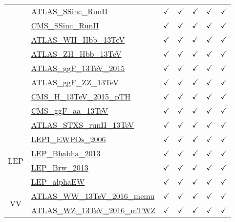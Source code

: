 \documentclass{article}
\begin{document}
\begin{longtable}{|c|l|c|c|c|c|c|}
 & \href{https://arxiv.org}{ATLAS_SSinc_RunII}  & $\checkmark$ & $\checkmark$ & $\checkmark$ & $\checkmark$ & $\checkmark$\\ \cline{2-7}
 & \href{https://arxiv.org}{CMS_SSinc_RunII}  & $\checkmark$ & $\checkmark$ & $\checkmark$ & $\checkmark$ & $\checkmark$\\ \cline{2-7}
 & \href{https://arxiv.org}{ATLAS_WH_Hbb_13TeV}  & $\checkmark$ & $\checkmark$ & $\checkmark$ & $\checkmark$ & $\checkmark$\\ \cline{2-7}
 & \href{https://arxiv.org}{ATLAS_ZH_Hbb_13TeV}  & $\checkmark$ & $\checkmark$ & $\checkmark$ & $\checkmark$ & $\checkmark$\\ \cline{2-7}
 & \href{https://arxiv.org}{ATLAS_ggF_13TeV_2015}  & $\checkmark$ & $\checkmark$ & $\checkmark$ & $\checkmark$ & $\checkmark$\\ \cline{2-7}
 & \href{https://arxiv.org}{ATLAS_ggF_ZZ_13TeV}  & $\checkmark$ & $\checkmark$ & $\checkmark$ & $\checkmark$ & $\checkmark$\\ \cline{2-7}
 & \href{https://arxiv.org}{CMS_H_13TeV_2015_pTH}  & $\checkmark$ & $\checkmark$ & $\checkmark$ & $\checkmark$ & $\checkmark$\\ \cline{2-7}
 & \href{https://arxiv.org}{CMS_ggF_aa_13TeV}  & $\checkmark$ & $\checkmark$ & $\checkmark$ & $\checkmark$ & $\checkmark$\\ \cline{2-7}
 & \href{https://arxiv.org}{ATLAS_STXS_runII_13TeV}  & $\checkmark$ & $\checkmark$ & $\checkmark$ & $\checkmark$ & $\checkmark$
\\ \hline
\multirow{4}{*}{LEP}
 & \href{https://arxiv.org}{LEP1_EWPOs_2006}  & $\checkmark$ & $\checkmark$ & $\checkmark$ & $\checkmark$ & $\checkmark$\\ \cline{2-7}
 & \href{https://arxiv.org}{LEP_Bhabha_2013}  & $\checkmark$ & $\checkmark$ & $\checkmark$ & $\checkmark$ & $\checkmark$\\ \cline{2-7}
 & \href{https://arxiv.org}{LEP_Brw_2013}  & $\checkmark$ & $\checkmark$ & $\checkmark$ & $\checkmark$ & $\checkmark$\\ \cline{2-7}
 & \href{https://arxiv.org}{LEP_alphaEW}  & $\checkmark$ & $\checkmark$ & $\checkmark$ & $\checkmark$ & $\checkmark$
\\ \hline
\multirow{8}{*}{VV}
 & \href{https://arxiv.org}{ATLAS_WW_13TeV_2016_memu}  & $\checkmark$ & $\checkmark$ & $\checkmark$ & $\checkmark$ & $\checkmark$\\ \cline{2-7}
 & \href{https://arxiv.org}{ATLAS_WZ_13TeV_2016_mTWZ}  & $\checkmark$ & $\checkmark$ & $\checkmark$ & $\checkmark$ & $\checkmark$\\ \cline{2-7}

\end{longtable}
\end{document}
